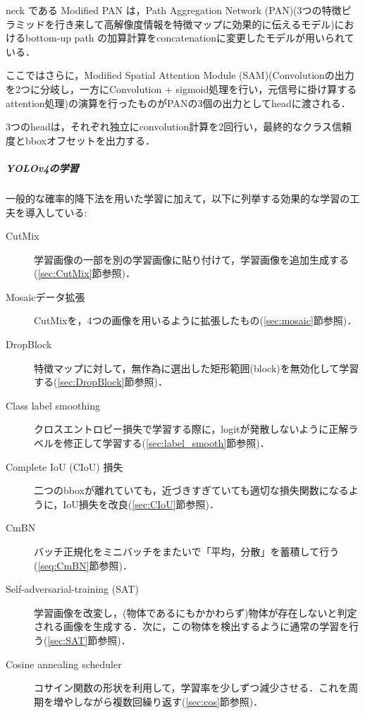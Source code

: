 \documentclass[twocolumn]{jsarticle} %
\begin{document}
neck である Modified PAN は，Path Aggregation Network (PAN)(3つの特徴ピラミッドを行き来して高解像度情報を特徴マップに効果的に伝えるモデル)におけるbottom-up path の加算計算をconcatenationに変更したモデルが用いられている．

ここではさらに，Modified Spatial Attention Module (SAM)(Convolutionの出力を2つに分岐し，一方にConvolution + sigmoid処理を行い，元信号に掛け算するattention処理)の演算を行ったものがPANの3個の出力としてheadに渡される．

3つのheadは，それぞれ独立にconvolution計算を2回行い，最終的なクラス信頼度とbboxオフセットを出力する．

\subparagraph{YOLOv4の学習}一般的な確率的降下法を用いた学習に加えて，以下に列挙する効果的な学習の工夫を導入している: 

\begin{description}
    \item[CutMix] 学習画像の一部を別の学習画像に貼り付けて，学習画像を追加生成する(\ref{sec:CutMix}節参照)．
    \item[Mosaicデータ拡張] CutMixを，4つの画像を用いるように拡張したもの(\ref{sec:mosaic}節参照)．
    \item[DropBlock] 特徴マップに対して，無作為に選出した矩形範囲(block)を無効化して学習する(\ref{sec:DropBlock}節参照)．
    \item[Class label smoothing] クロスエントロピー損失で学習する際に，logitが発散しないように正解ラベルを修正して学習する(\ref{sec:label_smooth}節参照)．
    \item[Complete IoU (CIoU) 損失] 二つのbboxが離れていても，近づきすぎていても適切な損失関数になるように，IoU損失を改良(\ref{sec:CIoU}節参照)．
    \item[CmBN] バッチ正規化をミニバッチをまたいで「平均，分散」を蓄積して行う(\ref{seq:CmBN}節参照)．
    \item[Self-adversarial-training (SAT)] 学習画像を改変し，(物体であるにもかかわらず)物体が存在しないと判定される画像を生成する．次に，この物体を検出するように通常の学習を行う(\ref{sec:SAT}節参照)．
    \item[Cosine annealing scheduler] コサイン関数の形状を利用して，学習率を少しずつ減少させる．これを周期を増やしながら複数回繰り返す(\ref{sec:cos}節参照)．
\end{description}
\end{document}
